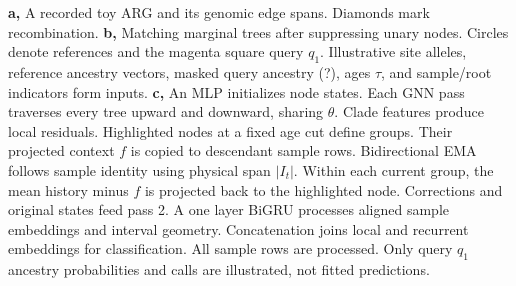 \textbf{a,} A recorded toy ARG and its genomic edge spans. Diamonds mark recombination.
\textbf{b,} Matching marginal trees after suppressing unary nodes. Circles denote references and the magenta square query $q_1$. Illustrative site alleles, reference ancestry vectors, masked query ancestry (?), ages $\tau$, and sample/root indicators form inputs.
\textbf{c,} An MLP initializes node states. Each GNN pass traverses every tree upward and downward, sharing $\theta$. Clade features produce local residuals. Highlighted nodes at a fixed age cut define groups. Their projected context $f$ is copied to descendant sample rows. Bidirectional EMA follows sample identity using physical span $|I_t|$. Within each current group, the mean history minus $f$ is projected back to the highlighted node. Corrections and original states feed pass 2. A one layer BiGRU processes aligned sample embeddings and interval geometry. Concatenation joins local and recurrent embeddings for classification. All sample rows are processed. Only query $q_1$ ancestry probabilities and calls are illustrated, not fitted predictions.
